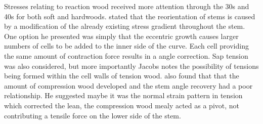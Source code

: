 Stresses relating to reaction wood received more attention through the 30s and
40s for both soft and hardwoods. \citet{jacobs1945l} stated that the reorientation of
stems is caused by a modification of the already existing stress gradient
throughout the stem. One option he presented was simply that the eccentric
growth causes larger numbers of cells to be added to the inner side of the
curve. Each cell providing the same amount of contraction force results in a
angle correction. Sap tension was also considered, but
more importantly Jacobs notes the possibility of tensions being formed within the
cell walls of tension wood.
\citet{jacobs1945l} also found that that the amount of
compression wood developed and the stem angle recovery had a poor relationship.
He suggested maybe it was the normal strain pattern in tension which
corrected the lean, the compression wood mealy acted as a pivot, not contributing
a tensile force on the lower side of the stem.

